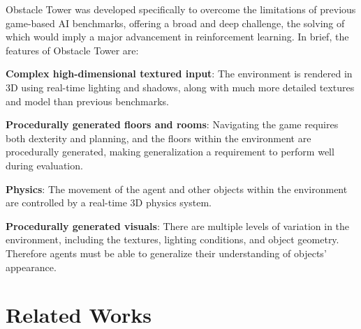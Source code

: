 \documentclass[conference]{IEEEtran}
\begin{document}
Obstacle Tower was developed specifically to overcome the limitations of previous game-based AI benchmarks, offering a broad and deep challenge, the solving of which would imply a major advancement in reinforcement learning. In brief, the features of Obstacle Tower are:

\textbf{Complex high-dimensional textured input}: The environment is rendered in 3D using real-time lighting and shadows, along with much more detailed textures and model than previous benchmarks. 

\textbf{Procedurally generated floors and rooms}: Navigating the game requires both dexterity and planning, and the floors within the environment are procedurally generated, making generalization a requirement to perform well during evaluation. 

\textbf{Physics}: The movement of the agent and other objects within the environment are controlled by a real-time 3D physics system.

\textbf{Procedurally generated visuals}: There are multiple levels of variation in the environment, including the textures, lighting conditions, and object geometry. Therefore agents must be able to generalize their understanding of objects’ appearance.

\section{Related Works}
\end{document}
